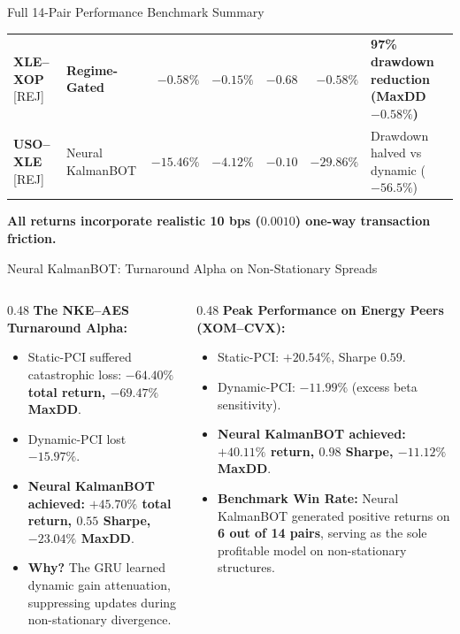 \documentclass[10pt, aspectratio=169]{beamer}
\begin{document}
\begin{frame}{Full 14-Pair Performance Benchmark Summary}
\begin{table}
\begin{tabular}{@{}llrrrrp{4.2cm}@{}}
      \textbf{XLE--XOP} [REJ] & \textbf{Regime-Gated} & $-0.58\%$ & $-0.15\%$ & $-0.68$ & $\mathbf{-0.58\%}$ & \textbf{97\% drawdown reduction (MaxDD $-0.58\%$)} \\
      \textbf{USO--XLE} [REJ] & Neural KalmanBOT & $-15.46\%$ & $-4.12\%$ & $-0.10$ & $\mathbf{-29.86\%}$ & Drawdown halved vs dynamic ($-56.5\%$) \\
      \bottomrule
    \end{tabular}
  \end{table}
  \vspace{2pt}
  \begin{center}
    \textbf{All returns incorporate realistic 10 bps ($0.0010$) one-way transaction friction.}
  \end{center}
\end{frame}

\begin{frame}{Neural KalmanBOT: Turnaround Alpha on Non-Stationary Spreads}
  \begin{columns}[T]
    \begin{column}{0.48\textwidth}
      \textbf{The NKE--AES Turnaround Alpha:}
      \begin{itemize}
        \item Static-PCI suffered catastrophic loss: \textcolor{negred}{\textbf{$-64.40\%$ total return, $-69.47\%$ MaxDD}}.
        \item Dynamic-PCI lost \textcolor{negred}{$-15.97\%$}.
        \item \textbf{Neural KalmanBOT achieved:} \textcolor{posgreen}{\textbf{$+45.70\%$ total return, $0.55$ Sharpe, $-23.04\%$ MaxDD}}.
        \item \textbf{Why?} The GRU learned dynamic gain attenuation, suppressing updates during non-stationary divergence.
      \end{itemize}
    \end{column}
    \begin{column}{0.48\textwidth}
      \textbf{Peak Performance on Energy Peers (XOM--CVX):}
      \begin{itemize}
        \item Static-PCI: $+20.54\%$, Sharpe $0.59$.
        \item Dynamic-PCI: $-11.99\%$ (excess beta sensitivity).
        \item \textbf{Neural KalmanBOT achieved:} \textcolor{posgreen}{\textbf{$+40.11\%$ return, $0.98$ Sharpe, $-11.12\%$ MaxDD}}.
        \item \textbf{Benchmark Win Rate:} Neural KalmanBOT generated positive returns on \textbf{6 out of 14 pairs}, serving as the sole profitable model on non-stationary structures.
      \end{itemize}
    \end{column}
  \end{columns}
\end{frame}
\end{document}
